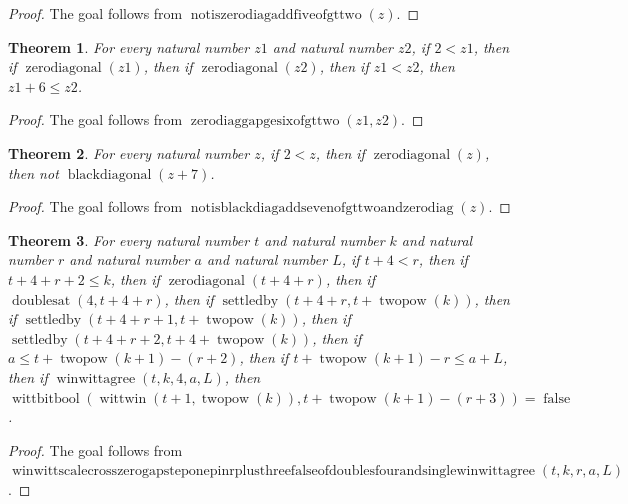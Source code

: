 \documentclass[11pt]{article}
\newtheorem{theorem}{Theorem}[section]
\theoremstyle{definition}
\begin{document}
\begin{proof}
The goal follows from \(\operatorname{notiszerodiagaddfiveofgttwo}(z)\).
\end{proof}
\begin{theorem}
\label{ll:paper:zero-diag-gap-ge-six-of-gt-two}
For every natural number \(z1\) and natural number \(z2\), if \(2 < z1\), then if \(\operatorname{zerodiagonal}(z1)\), then if \(\operatorname{zerodiagonal}(z2)\), then if \(z1 < z2\), then \(z1 + 6 \le z2\).
\end{theorem}
\begin{proof}
The goal follows from \(\operatorname{zerodiaggapgesixofgttwo}(z1, z2)\).
\end{proof}
\begin{theorem}
\label{ll:paper:not-isblackdiag-add-seven-of-gt-two-and-zero-diag}
For every natural number \(z\), if \(2 < z\), then if \(\operatorname{zerodiagonal}(z)\), then not \(\operatorname{blackdiagonal}(z + 7)\).
\end{theorem}
\begin{proof}
The goal follows from \(\operatorname{notisblackdiagaddsevenofgttwoandzerodiag}(z)\).
\end{proof}
\begin{theorem}
\label{ll:paper:winwitt-scale-cross-zero-gap-step-one-pin-r-plus-three-false-of-doubles-four-and-single-winwittagree}
For every natural number \(t\) and natural number \(k\) and natural number \(r\) and natural number \(a\) and natural number \(L\), if \(t + 4 < r\), then if \(t + 4 + r + 2 \le k\), then if \(\operatorname{zerodiagonal}(t + 4 + r)\), then if \(\operatorname{doublesat}(4, t + 4 + r)\), then if \(\operatorname{settledby}(t + 4 + r, t + \operatorname{twopow}(k))\), then if \(\operatorname{settledby}(t + 4 + r + 1, t + \operatorname{twopow}(k))\), then if \(\operatorname{settledby}(t + 4 + r + 2, t + 4 + \operatorname{twopow}(k))\), then if \(a \le t + \operatorname{twopow}(k + 1) - (r + 2)\), then if \(t + \operatorname{twopow}(k + 1) - r \le a + L\), then if \(\operatorname{winwittagree}(t, k, 4, a, L)\), then \(\operatorname{wittbitbool}(\operatorname{wittwin}(t + 1, \operatorname{twopow}(k)), t + \operatorname{twopow}(k + 1) - (r + 3)) = \operatorname{false}\).
\end{theorem}
\begin{proof}
The goal follows from \(\operatorname{winwittscalecrosszerogapsteponepinrplusthreefalseofdoublesfourandsinglewinwittagree}(t, k, r, a, L)\).
\end{proof}
\end{document}
